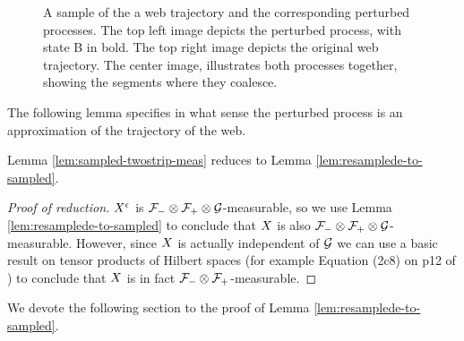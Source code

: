 {\begin{figure}
   \caption{
   A sample of the a web trajectory and the corresponding perturbed processes.
   The top left image depicts the perturbed process, with state B in bold.
   The top right image depicts the original web trajectory. The center image,
   illustrates both processes together, showing the segments where they coalesce.
   }
\end{figure}

The following lemma specifies in what sense the perturbed process is
an approximation of the trajectory of the web.

\begin{lemma}
  \label{lem:resamplede-to-sampled}
  \statementoflemresampledetosampled
\end{lemma}

Lemma \ref{lem:sampled-twostrip-meas} reduces to Lemma
\ref{lem:resamplede-to-sampled}.

\begin{proof}[Proof of reduction]
  $X^{\epsilon}$ is $\mathcal{F}_{-} \otimes \mathcal{F}_{+} \otimes \mathcal{G}$-measurable, so we use Lemma
  \ref{lem:resamplede-to-sampled} to conclude that $X$ is also
  $\mathcal{F}_{-} \otimes \mathcal{F}_{+} \otimes \mathcal{G}$-measurable.  However, since $X$ is
  actually independent of $\mathcal{G}$ we can use a basic result on
  tensor products of Hilbert spaces (for example Equation (2c8) on p12 of
  \cite{tsirelson-noise-as-a-boolean-algebra}) to conclude that $X$ is
  in fact $\mathcal{F}_{-} \otimes \mathcal{F}_{+}$-measurable.
\end{proof}

We devote the following section to the proof of Lemma
\ref{lem:resamplede-to-sampled}.
}
